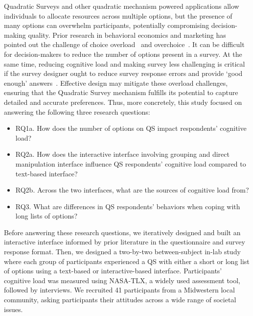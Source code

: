 Quadratic Surveys and other quadratic mechanism powered applications allow individuals to allocate resources across multiple options, but the presence of many options can overwhelm participants, potentially compromising decision-making quality. Prior research in behavioral economics and marketing has pointed out the challenge of choice overload~\cite{iyengarWhenChoiceDemotivating2000} and overchoice~\cite{gourvilleOverchoiceAssortmentType2005}. It can be difficult for decision-makers to reduce the number of options present in a survey. At the same time, reducing cognitive load and making survey less challenging is critical if the survey designer ought to reduce survey response errors and provide `good enough' answers~\cite{lenznerCognitiveBurdenSurvey2010, blessAskingDifficultQuestions1992}. Effective design may mitigate these overload challenges, ensuring that the Quadratic Survey mechanism fulfills its potential to capture detailed and accurate preferences. Thus, more concretely, this study focused on answering the following three research questions:
\begin{itemize}
\item RQ1a. How does the number of options on QS impact respondents' cognitive load?
\item RQ2a. How does the interactive interface involving grouping and direct manipulation interface influence QS respondents' cognitive load compared to text-based interface?
\item RQ2b. Across the two interfaces, what are the sources of cognitive load from?
\item RQ3. What are differences in QS respondents' behaviors when coping with long lists of options?
\end{itemize}

Before answering these research questions, we iteratively designed and built an interactive interface informed by prior literature in the questionnaire and survey response format. Then, we designed a two-by-two between-subject in-lab study where each group of participants experienced a QS with either a short or long list of options using a text-based or interactive-based interface. Participants' cognitive load was measured using NASA-TLX, a widely used assessment tool, followed by interviews. We recruited 41 participants from a Midwestern local community, asking participants their attitudes across a wide range of societal issues.

